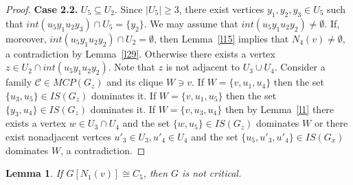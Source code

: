 \documentclass[12pt]{article}
\newtheorem{lemma}{Lemma}
\begin{document}
\begin{proof}
\textbf{Case 2.2.} $U_5 \subseteq U_2$. Since $|U_5| \geq 3$, there exist vertices $y_1,y_2,y_3 \in U_5$ such that $int(u_5y_1u_2y_3) \cap U_5 = \{y_2\}$. We may assume that  $int(u_5y_1u_2y_2) \neq \emptyset$. If, moreover, $ int(u_5y_1u_2y_2) \cap U_2  = \emptyset$, then Lemma~\ref{l15} implies that $N_4(v) \neq \emptyset$, a contradiction by Lemma~\ref{l29}. Otherwise there exists a vertex $z \in U_2 \cap int(u_5y_1u_2y_2)$. Note that $z$ is not adjacent to $U_3 \cup U_4$. Consider a family $\mathcal{C} \in MCP(G_z)$ and its clique $W \ni v$. If $W = \{v,u_1,u_4\}$ then the set $\{u_3,u_5\} \in IS(G_z)$ dominates it. If $W = \{v,u_1,u_5\}$ then the set $\{y_3,u_4\} \in IS(G_z)$ dominates it. If $W = \{v,u_3,u_4\}$ then by Lemma~\ref{l1} there exists a vertex $w \in U_3 \cap U_4$ and the set $\{w,u_5\} \in IS(G_z)$ dominates $W$ or there exist nonadjacent vertces $u'_3 \in U_3, u'_4 \in U_4$ and the set $\{u_5,u'_3,u'_4\} \in IS(G_x)$ dominates $W$, a contradiction.

\end{proof}


\begin{lemma}\label{l32}
If $G[N_1(v)] \cong C_5$, then $G$ is not critical.
\end{lemma}
\end{document}
